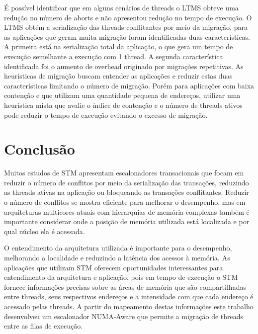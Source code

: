 \documentclass[diss,capa]{texufpel}
\begin{document}
É possível identificar que em alguns cenários de threads o LTMS obteve uma redução no número de aborts e não apresentou redução no tempo de execução. O LTMS obtém a serialização das threads conflitantes por meio da migração, para as aplicações que geram muita migração foram identificadas duas características. A primeira está na serialização total da aplicação, o que gera um tempo de execução semelhante a execução com 1 thread. A segunda característica identificada foi o aumento de overhead originado por migrações repetitivas. As heurísticas de migração buscam entender as aplicações e reduzir estas duas características limitando o número de migração. Porém para aplicações com baixa contenção e que utilizam uma quantidade pequena de endereços, utilizar uma heurística mista que avalie o índice de contenção e o número de threads ativos pode reduzir o tempo de execução evitando o excesso de migração.

\chapter{Conclusão}
\label{chapter::conclusao}

Muitos estudos de STM apresentam escalonadores transacionais que focam em reduzir o número de conflitos por meio da serialização das transações, reduzindo as threads ativas na aplicação ou bloqueando as transações conflitantes. Reduzir o número de conflitos se mostra eficiente para melhorar o desempenho, mas em arquiteturas multicores atuais com hierarquias de memória complexas também é importante considerar onde a posição de memória utilizada está localizada e por qual núcleo ela é acessada.

O entendimento da arquitetura utilizada é importante para o desempenho, melhorando a localidade e reduzindo a latência dos acessos à memória. As aplicações que utilizam STM oferecem oportunidades interessantes para entendimento da arquitetura e aplicação, pois em tempo de execução o STM fornece informações precisas sobre as áreas de memória que são compartilhadas entre threads, seus respectivos endereços e a intensidade com que cada endereço é acessado pelas threads. A partir do mapeamento destas informações este trabalho desenvolveu um escalonador NUMA-Aware que permite a migração de threads entre as filas de execução.
\end{document}
